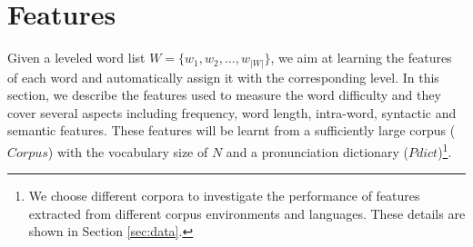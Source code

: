 \section{Features}
\label{sec:approach}
Given a leveled word list $W=\{w_1, w_2,\dots,w_{|W|}\}$, we aim at learning the features of each word and automatically assign it with the corresponding level.
In this section, we describe the features used to measure the word difficulty and they cover several aspects including frequency, word length, intra-word, syntactic and semantic features.
These features will be learnt from a sufficiently large corpus ($Corpus$) with the vocabulary size of $N$ and a pronunciation dictionary ($Pdict$)\footnote{We choose different corpora to investigate the performance of features extracted from different corpus environments and languages. These details are shown in Section \ref{sec:data}.}.



